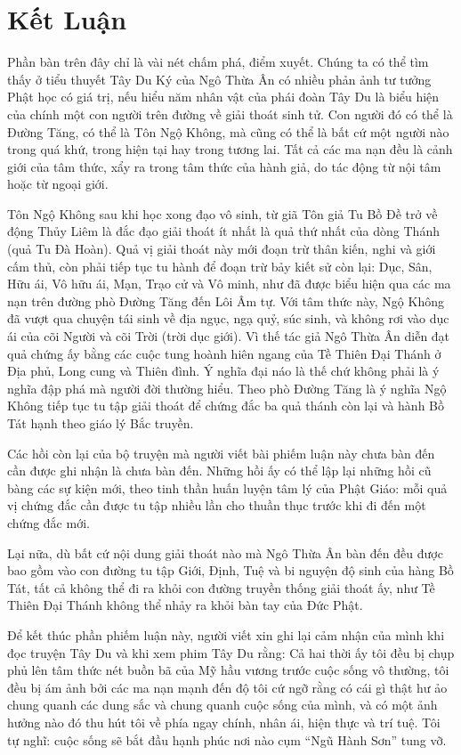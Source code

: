 \chapter{Kết Luận} %
\label{cha:ket_luan}

Phần bàn trên đây chỉ là vài nét chấm phá, điểm xuyết. Chúng ta có thể tìm thấy ở tiểu thuyết Tây Du Ký của Ngô Thừa Ân có nhiều phản ảnh tư tưởng Phật học có giá trị, nếu hiểu năm nhân vật của phái đoàn Tây Du là biểu hiện của chính một con người trên đường về giải thoát sinh tử. Con người đó có thể là Đường Tăng, có thể là Tôn Ngộ Không, mà cũng có thể là bất cứ một người nào trong quá khứ, trong hiện tại hay trong tương lai. Tất cả các ma nạn đều là cảnh giới của tâm thức, xẩy ra trong tâm thức của hành giả, do tác động từ nội tâm hoặc từ ngoại giới.

Tôn Ngộ Không sau khi học xong đạo vô sinh, từ giã Tôn giả Tu Bồ Đề trở về động Thủy Liêm là đắc đạo giải thoát ít nhất là quả thứ nhất của dòng Thánh (quả Tu Đà Hoàn). Quả vị giải thoát này mới đoạn trừ thân kiến, nghi và giới cấm thủ, còn phải tiếp tục tu hành để đoạn trừ bảy kiết sử còn lại: Dục, Sân, Hữu ái, Vô hữu ái, Mạn, Trạo cử và Vô minh, như đã được biểu hiện qua các ma nạn trên đường phò Đường Tăng đến Lôi Âm tự. Với tâm thức này, Ngộ Không đã vượt qua chuyện tái sinh về địa ngục, ngạ quỷ, súc sinh, và không rơi vào dục ái của cõi Người và cõi Trời (trời dục giới). Vì thế tác giả Ngô Thừa Ân diễn đạt quả chứng ấy bằng các cuộc tung hoành hiên ngang của Tề Thiên Đại Thánh ở Địa phủ, Long cung và Thiên đình. Ý nghĩa đại náo là thế chứ không phải là ý nghĩa đập phá mà người đời thường hiểu. Theo phò Đường Tăng là ý nghĩa Ngộ Không tiếp tục tu tập giải thoát để chứng đắc ba quả thánh còn lại và hành Bồ Tát hạnh theo giáo lý Bắc truyền.

Các hồi còn lại của bộ truyện mà người viết bài phiếm luận này chưa bàn đến cần được ghi nhận là chưa bàn đến. Những hồi ấy có thể lập lại những hồi cũ bàng các sự kiện mới, theo tinh thần huấn luyện tâm lý của Phật Giáo: mỗi quả vị chứng đắc cần được tu tập nhiều lần cho thuần thục trước khi đi đến một chứng đắc mới.

Lại nữa, dù bất cứ nội dung giải thoát nào mà Ngô Thừa Ân bàn đến đều được bao gồm vào con đường tu tập Giới, Định, Tuệ và bi nguyện độ sinh của hàng Bồ Tát, tất cả không thể đi ra khỏi con đường truyền thống giải thoát ấy, như Tề Thiên Đại Thánh không thể nhảy ra khỏi bàn tay của Đức Phật.

Để kết thúc phần phiếm luận này, người viết xin ghi lại cảm nhận của mình khi đọc truyện Tây Du và khi xem phim Tây Du rằng: Cả hai thời ấy tôi đều bị chụp phủ lên tâm thức nét buồn bã của Mỹ hầu vương trước cuộc sống vô thường, tôi đều bị ám ảnh bởi các ma nạn mạnh đến độ tôi cứ ngỡ rằng có cái gì thật hư ảo chung quanh các dung sắc và chung quanh cuộc sống của mình, và có một ảnh hưởng nào đó thu hút tôi về phía ngay chính, nhân ái, hiện thực và trí tuệ. Tôi tự nghĩ: cuộc sống sẽ bắt đầu hạnh phúc nơi nào cụm ``Ngũ Hành Sơn'' tung vỡ.

\afterpage{\blankpage}
\addtocounter{page}{+1}